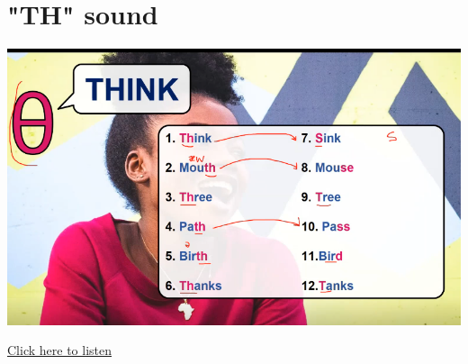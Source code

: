 \section{"TH" sound }
\begin{center}
\includegraphics[width=1\textwidth]{images/voiceless_th_portrait.png}
\end{center}

\href{https://drive.google.com/file/d/1Qyxh_48GAe7lFPCOfUzlbQGeDip13594/view?usp=drive_link}{Click here to listen}

